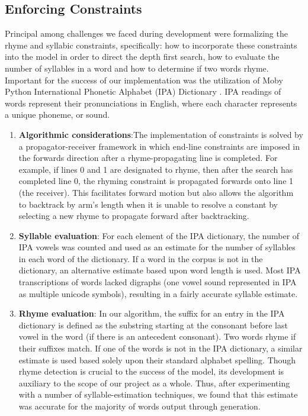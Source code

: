\documentclass[10pt,twocolumn]{article}
\begin{document}
\subsection{Enforcing Constraints}
Principal among challenges we faced during development were formalizing the rhyme and syllabic constraints, specifically: how to incorporate these constraints into the model in order to direct the depth first search, how to evaluate the number of syllables in a word and how to determine if two words rhyme. Important for the success of our implementation was the utilization of Moby Python International Phonetic Alphabet (IPA) Dictionary \cite{Moby}. IPA readings of words represent their pronunciations in English, where each character represents a unique phoneme, or sound. 
\begin{enumerate}
\item \textbf{Algorithmic considerations}:The implementation of constraints is solved by a propagator-receiver framework in which end-line constraints are imposed in the forwards direction after a rhyme-propagating line is completed. For example, if lines 0 and 1 are designated to rhyme, then after the search has completed line 0, the rhyming constraint is propagated forwards onto line 1 (the receiver). This facilitates forward motion but also allows the algorithm to backtrack by arm's length when it is unable to resolve a constant by selecting a new rhyme to propagate forward after backtracking. 

\item \textbf{Syllable evaluation}: For each element of the IPA dictionary, the number of IPA vowels was counted and used as an estimate for the number of syllables in each word of the dictionary.  If a word in the corpus is not in the dictionary, an alternative estimate based upon word length is used. Most IPA transcriptions of words lacked digraphs (one vowel sound represented in IPA as multiple unicode symbols), resulting in a fairly accurate syllable estimate.

\item \textbf{Rhyme evaluation}: In our algorithm, the suffix for an entry in the IPA dictionary is defined as the substring starting at the consonant before last vowel in the word (if there is an antecedent consonant). Two words rhyme if their suffixes match. If one of the words is not in the IPA dictionary, a similar estimate is used based solely upon their standard alphabet spelling. Though rhyme detection is crucial to the success of the model, its development is auxiliary to the scope of our project as a whole. Thus, after experimenting with a number of syllable-estimation techniques, we found that this estimate was accurate for the majority of words output through generation.

\end{enumerate}
\end{document}
